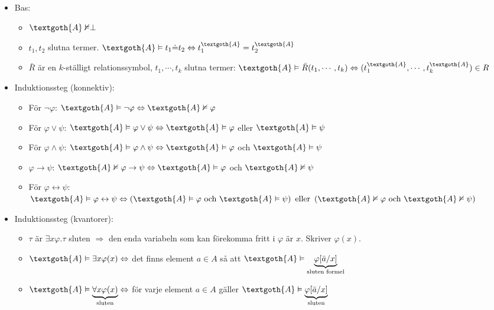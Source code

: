 \begin{itemize}
  \item Bas:
    \begin{itemize}
      \item $\textgoth{A}\nvDash\perp$
      \item $t_1,t_2$ slutna termer. $\textgoth{A}\vDash t_1\dot{=}t_2 \Lrarr t_1^{\textgoth{A}}=t_2^{\textgoth{A}}$
      \item $\bar{R}$ är en $k$-ställigt relationssymbol, $t_1,\cdots, t_k$ slutna termer: $\textgoth{A}\vDash\bar{R}(t_1,\cdots, t_k) \Lrarr (t_1^{\textgoth{A}},\cdots, t_k^{\textgoth{A}})\in R$
    \end{itemize}
  \item Induktionssteg (konnektiv):
    \begin{itemize}
      \item För $\neg\varphi$: $\textgoth{A}\vDash\neg\varphi\Lrarr\textgoth{A}\nvDash\varphi$
      \item För $\varphi\vee\psi$: $\textgoth{A}\vDash\varphi\vee\psi\Lrarr \textgoth{A}\vDash\varphi$ eller $\textgoth{A}\vDash\psi$
      \item För $\varphi\wedge\psi$: $\textgoth{A}\vDash\varphi\wedge\psi\Lrarr \textgoth{A}\vDash\varphi$ och $\textgoth{A}\vDash\psi$
      \item $\varphi\rightarrow\psi$: $\textgoth{A}\nvDash\varphi\rightarrow\psi\Lrarr \textgoth{A}\vDash\varphi$ och $\textgoth{A}\nvDash\psi$
      \item För $\varphi\leftrightarrow\psi$: $\textgoth{A}\vDash\varphi\leftrightarrow\psi\Lrarr\left(\textgoth{A}\vDash\varphi\text{ och } \textgoth{A}\vDash\psi\right)\text{ eller }\left(\textgoth{A}\nvDash\varphi\text{ och }\textgoth{A}\nvDash\psi\right)$
    \end{itemize}
  \item Induktionssteg (kvantorer):
    \begin{itemize}
      \item $\tau$ är $\exists x\varphi$.\qquad $\tau$ sluten $\Rightarrow$ den enda variabeln som kan förekomma fritt i $\varphi$ är $x$. Skriver $\varphi(x)$.
      \item $\textgoth{A}\vDash\exists x\varphi(x)\Lrarr$ det finns element $a\in A$ så att $\textgoth{A}\vDash\underbrace{\varphi[\bar{a}/x]}_{\text{sluten formel}}$
      \item $\textgoth{A}\vDash\underbrace{\forall x\varphi(x)}_{\text{sluten}}\Lrarr$ för varje element $a\in A$ gäller $\textgoth{A}\vDash\underbrace{\varphi[\bar{a}/x]}_{\text{sluten}}$
    \end{itemize}
\end{itemize}
